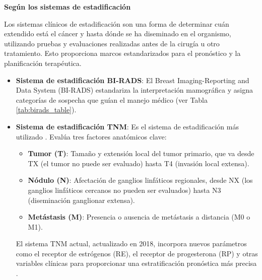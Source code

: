 \documentclass[a4paper,10pt]{book}
\begin{document}
\textbf{Según los sistemas de estadificación}

Los sistemas clínicos de estadificación son una forma de determinar cuán extendido está el cáncer y hasta dónde se ha diseminado en el organismo, utilizando pruebas y evaluaciones realizadas antes de la cirugía u otro tratamiento. Esto proporciona marcos estandarizados para el pronóstico y la planificación terapéutica.

\begin{itemize}
	\item \textbf{Sistema de estadificación BI-RADS}: El Breast Imaging-Reporting and Data System (BI-RADS)\cite{magny_breast_2025} estandariza la interpretación mamográfica y asigna categorías de sospecha que guían el manejo médico (ver Tabla \ref{tab:birads_table}).
    \item  \textbf{Sistema de estadificación TNM}: Es el sistema de estadificación más utilizado \cite{noauthor_stages_nodate}. Evalúa tres factores anatómicos clave:
    \begin{itemize}
        \item \textbf{Tumor (T)}: Tamaño y extensión local del tumor primario, que va desde TX (el tumor no puede ser evaluado) hasta T4 (invasión local extensa).
        \item \textbf{Nódulo (N)}: Afectación de ganglios linfáticos regionales, desde NX (los ganglios linfáticos cercanos no pueden ser evaluados) hasta N3 (diseminación ganglionar extensa).
        \item \textbf{Metástasis (M)}: Presencia o ausencia de metástasis a distancia (M0 o M1).
  \end{itemize}
  El sistema TNM actual, actualizado en 2018, incorpora nuevos parámetros como el receptor de estrógenos (RE), el receptor de progesterona (RP) y otras variables clínicas para proporcionar una estratificación pronóstica más precisa \cite{hortobagyi_new_2018}. 
  
\end{itemize}
\end{document}
